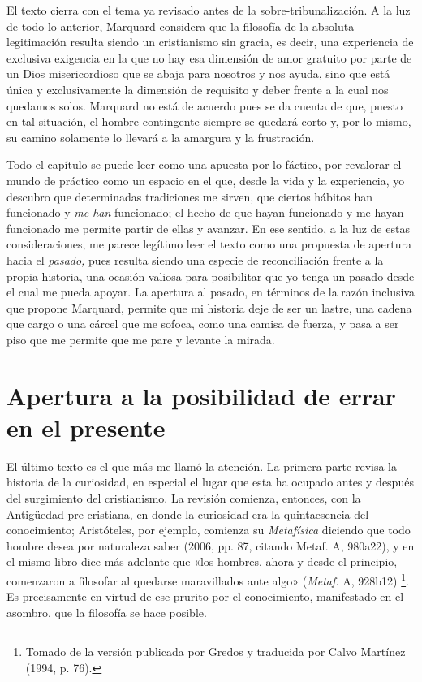 \begin{refsection}
El texto cierra con el tema ya revisado antes de la sobre-tribunalización. A la luz de todo lo anterior, Marquard considera que la filosofía de la absoluta legitimación resulta siendo un cristianismo sin gracia, es decir, una experiencia de exclusiva exigencia en la que no hay esa dimensión de amor gratuito por parte de un Dios misericordioso que se abaja para nosotros y nos ayuda, sino que está única y exclusivamente la dimensión de requisito y deber frente a la cual nos quedamos solos. Marquard no está de acuerdo pues se da cuenta de que, puesto en tal situación, el hombre contingente siempre se quedará corto y, por lo mismo, su camino solamente lo llevará a la amargura y la frustración.


Todo el capítulo se puede leer como una apuesta por lo fáctico, por revalorar el mundo de práctico como un espacio en el que, desde la vida y la experiencia, yo descubro que determinadas tradiciones me sirven, que ciertos hábitos han funcionado y \emph{me han} funcionado; el hecho de que hayan funcionado y me hayan funcionado me permite partir de ellas y avanzar. En ese sentido, a la luz de estas consideraciones, me parece legítimo leer el texto como una propuesta de apertura hacia el \emph{pasado,} pues resulta siendo una especie de reconciliación frente a la propia historia, una ocasión valiosa para posibilitar que yo tenga un pasado desde el cual me pueda apoyar. La apertura al pasado, en términos de la razón inclusiva que propone Marquard, permite que mi historia deje de ser un lastre, una cadena que cargo o una cárcel que me sofoca, como una camisa de fuerza, y pasa a ser piso que me permite que me pare y levante la mirada.

\section{Apertura a la posibilidad de errar en el presente}

El último texto es el que más me llamó la atención. La primera parte revisa la historia de la curiosidad, en especial el lugar que esta ha ocupado antes y después del surgimiento del cristianismo. La revisión comienza, entonces, con la Antigüedad pre-cristiana, en donde la curiosidad era la quintaesencia del conocimiento; Aristóteles, por ejemplo, comienza su \emph{Metafísica} diciendo que todo hombre desea por naturaleza saber (2006, pp. 87, citando Metaf. A, 980a22), y en el mismo libro dice más adelante que «los hombres, ahora y desde el principio, comenzaron a filosofar al quedarse maravillados ante algo» (\emph{Metaf.} A, 928b12) \footnote{Tomado de la versión publicada por Gredos y traducida por Calvo Martínez (1994, p. 76).}. Es precisamente en virtud de ese prurito por el conocimiento, manifestado en el asombro, que la filosofía se hace posible.


\end{refsection}
